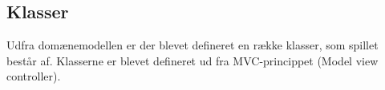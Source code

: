 \subsection{Klasser}
Udfra domænemodellen er der blevet defineret en række klasser, som spillet består af. Klasserne er blevet defineret ud fra MVC-princippet (Model view controller).





















